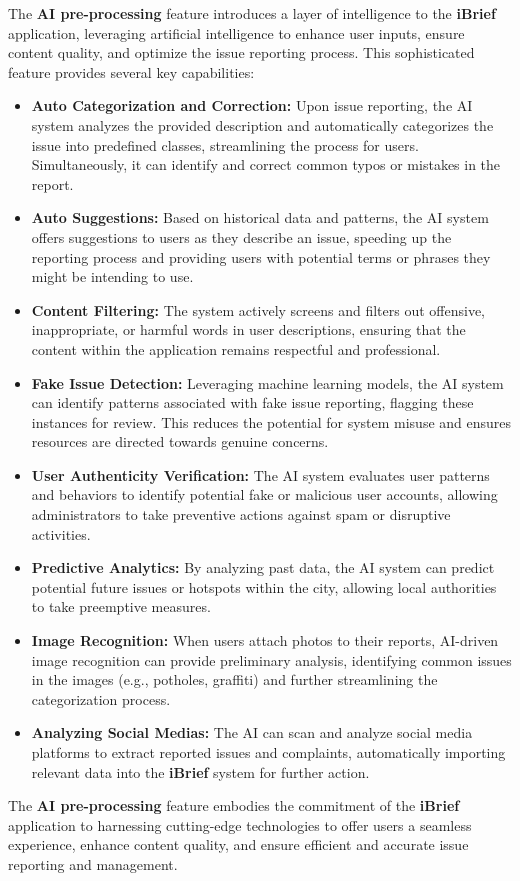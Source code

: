 The \textbf{\gls{AI} \gls{pre-processing}} feature introduces a layer of intelligence to the \textbf{iBrief} application, leveraging artificial intelligence to enhance user inputs, ensure content quality, and optimize the issue reporting process. This sophisticated feature provides several key capabilities:

\begin{itemize}
    \item \textbf{Auto Categorization and Correction:} Upon issue reporting, the \gls{AI} system analyzes the provided description and automatically categorizes the issue into predefined classes, streamlining the process for users. Simultaneously, it can identify and correct common typos or mistakes in the report.
    
    \item \textbf{Auto Suggestions:} Based on historical data and patterns, the \gls{AI} system offers suggestions to users as they describe an issue, speeding up the reporting process and providing users with potential terms or phrases they might be intending to use.
    
    \item \textbf{Content Filtering:} The system actively screens and filters out offensive, inappropriate, or harmful words in user descriptions, ensuring that the content within the application remains respectful and professional.
    
    \item \textbf{Fake Issue Detection:} Leveraging machine learning models, the \gls{AI} system can identify patterns associated with fake issue reporting, flagging these instances for review. This reduces the potential for system misuse and ensures resources are directed towards genuine concerns.
    
    \item \textbf{User Authenticity Verification:} The \gls{AI} system evaluates user patterns and behaviors to identify potential fake or malicious user accounts, allowing administrators to take preventive actions against spam or disruptive activities.
    
    \item \textbf{Predictive Analytics:} By analyzing past data, the \gls{AI} system can predict potential future issues or hotspots within the city, allowing local authorities to take preemptive measures.
    
    \item \textbf{Image Recognition:} When users attach photos to their reports, \gls{AI}-driven image recognition can provide preliminary analysis, identifying common issues in the images (e.g., potholes, graffiti) and further streamlining the categorization process.

    \item \textbf{Analyzing Social Medias:} The \gls{AI} can scan and analyze social media platforms to extract reported issues and complaints, automatically importing relevant data into the \textbf{iBrief} system for further action.
\end{itemize}

The \textbf{\gls{AI} \gls{pre-processing}} feature embodies the commitment of the \textbf{iBrief} application to harnessing cutting-edge technologies to offer users a seamless experience, enhance content quality, and ensure efficient and accurate issue reporting and management.
